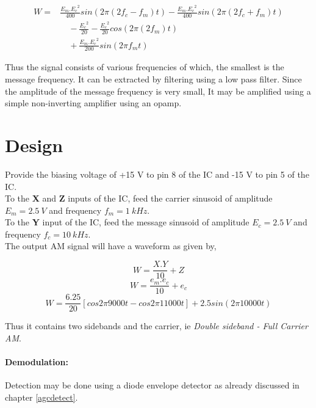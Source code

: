 \begin{equation}
\begin{split}
W=& \frac{E_m.{E_c}^2}{400}sin(2\pi (2f_c-f_m)t)  -  \frac{E_m.{E_c}^2}{400}sin(2\pi (2f_c+f_m)t)\\ 
&\quad -\frac{{E_c}^2}{20}-\frac{{E_c}^2}{20}cos(2\pi(2f_m)t) \\
&\quad +\frac{E_m.{E_c}^2}{200}sin(2\pi f_mt)
\end{split}
\end{equation}

Thus the signal consists of various frequencies of which, the smallest is the message frequency. It can be extracted by filtering using a low pass filter. Since the amplitude of the message frequency is very small, It may be amplified using a simple non-inverting amplifier using an opamp.

\section*{Design}
Provide the biasing voltage of +15 V to pin 8 of the IC and -15 V to pin 5 of the IC.\\

\noindent To the \textbf{X} and \textbf{Z} inputs of the IC, feed the carrier sinusoid of amplitude $E_m=2.5\ V$ and frequency $f_m= 1\ kHz$.\\
To the \textbf{Y} input of the IC, feed the message sinusoid of amplitude $E_c=2.5\ V$ and frequency $f_c= 10\ kHz$.\\

\noindent The output AM signal will have a waveform as given by,

\begin{equation}
W=\frac{X.Y}{10}+Z
\end{equation}
\begin{equation}
W=\frac{e_m.e_c}{10}+e_c
\end{equation}
\begin{equation}
W=\frac{6.25}{20}[cos 2\pi 9000t-cos 2\pi 11000t]+2.5 sin(2\pi10000t)
\end{equation}

\noindent Thus it contains two sidebands and the carrier, ie \emph{Double sideband - Full Carrier AM}.
\paragraph{Demodulation:}
Detection may be done using a diode envelope detector as already discussed in chapter \ref{agcdetect}.


